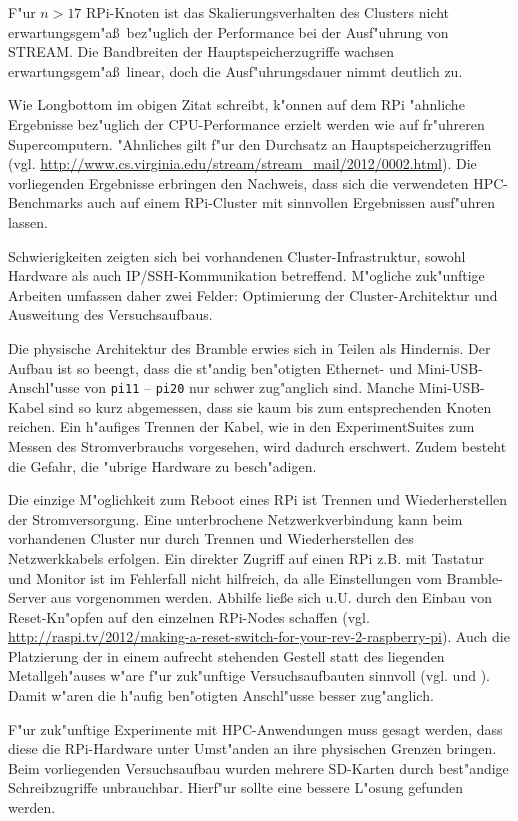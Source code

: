 F"ur $n>17$ RPi-Knoten ist das Skalierungsverhalten des Clusters nicht erwartungsgem"a\ss\ bez"uglich der Performance bei der Ausf"uhrung von STREAM. Die Bandbreiten der Hauptspeicherzugriffe wachsen erwartungsgem"a\ss\ linear, doch die Ausf"uhrungsdauer nimmt deutlich zu. 

Wie Longbottom im obigen Zitat schreibt, k"onnen auf dem RPi "ahnliche Ergebnisse bez"uglich der CPU-Performance erzielt werden wie auf fr"uhreren Supercomputern. "Ahnliches gilt f"ur den Durchsatz an Hauptspeicherzugriffen (vgl. \url{http://www.cs.virginia.edu/stream/stream_mail/2012/0002.html}). Die vorliegenden Ergebnisse erbringen den Nachweis, dass sich die verwendeten HPC-Benchmarks auch auf einem RPi-Cluster mit sinnvollen Ergebnissen ausf"uhren lassen. 

Schwierigkeiten zeigten sich bei vorhandenen Cluster-Infrastruktur, sowohl Hardware als auch IP/SSH-Kommunikation betreffend. M"ogliche zuk"unftige Arbeiten umfassen daher zwei Felder: Optimierung der Cluster-Architektur und Ausweitung des Versuchsaufbaus.

Die physische Architektur des Bramble erwies sich in Teilen als Hindernis. Der Aufbau ist so beengt, dass die st"andig ben"otigten Ethernet- und Mini-USB-Anschl"usse von \texttt{pi11} -- \texttt{pi20} nur schwer zug"anglich sind. Manche Mini-USB-Kabel sind so kurz abgemessen, dass sie kaum bis zum entsprechenden Knoten reichen. Ein h"aufiges Trennen der Kabel, wie in den ExperimentSuites zum Messen des Stromverbrauchs vorgesehen, wird dadurch erschwert. Zudem besteht die Gefahr, die "ubrige Hardware zu besch"adigen. 

Die einzige M"oglichkeit zum Reboot eines RPi ist Trennen und Wiederherstellen der Stromversorgung. Eine unterbrochene Netzwerkverbindung kann beim vorhandenen Cluster nur durch Trennen und Wiederherstellen des Netzwerkkabels erfolgen. Ein direkter Zugriff auf einen RPi z.B. mit Tastatur und Monitor ist im Fehlerfall nicht hilfreich, da alle Einstellungen vom Bramble-Server aus vorgenommen werden. Abhilfe lie\ss e sich u.U. durch den Einbau von Reset-Kn"opfen auf den einzelnen RPi-Nodes schaffen (vgl. \url{http://raspi.tv/2012/making-a-reset-switch-for-your-rev-2-raspberry-pi}). Auch die Platzierung der in einem aufrecht stehenden Gestell statt des liegenden Metallgeh"auses w"are f"ur zuk"unftige Versuchsaufbauten sinnvoll (vgl. \cite{kie01} und \cite{cox13}). Damit w"aren die h"aufig ben"otigten Anschl"usse besser zug"anglich. 

F"ur zuk"unftige Experimente mit HPC-Anwendungen muss gesagt werden, dass diese die RPi-Hardware unter Umst"anden an ihre physischen Grenzen bringen. Beim vorliegenden Versuchsaufbau wurden mehrere SD-Karten durch best"andige Schreibzugriffe unbrauchbar. Hierf"ur sollte eine bessere L"osung gefunden werden. 

